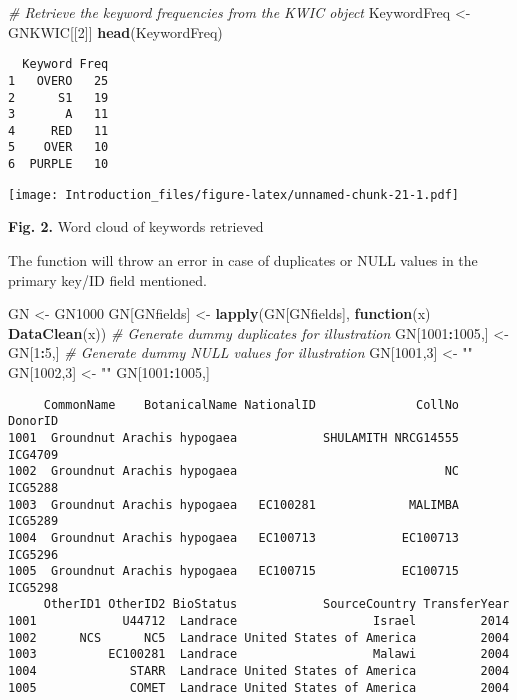 \documentclass[]{article}
\newenvironment{Shaded}{\begin{snugshade}}{\end{snugshade}}
\newcommand{\CommentTok}[1]{\textcolor[rgb]{0.56,0.35,0.01}{\textit{#1}}}
\newcommand{\ControlFlowTok}[1]{\textcolor[rgb]{0.13,0.29,0.53}{\textbf{#1}}}
\newcommand{\DecValTok}[1]{\textcolor[rgb]{0.00,0.00,0.81}{#1}}
\newcommand{\KeywordTok}[1]{\textcolor[rgb]{0.13,0.29,0.53}{\textbf{#1}}}
\newcommand{\NormalTok}[1]{#1}
\newcommand{\OperatorTok}[1]{\textcolor[rgb]{0.81,0.36,0.00}{\textbf{#1}}}
\newcommand{\StringTok}[1]{\textcolor[rgb]{0.31,0.60,0.02}{#1}}
\begin{document}
\begin{Shaded}
\begin{Highlighting}[]
\CommentTok{# Retrieve the keyword frequencies from the KWIC object}
\NormalTok{KeywordFreq <-}\StringTok{ }\NormalTok{GNKWIC[[}\DecValTok{2}\NormalTok{]]}
\KeywordTok{head}\NormalTok{(KeywordFreq)}
\end{Highlighting}
\end{Shaded}

\begin{verbatim}
  Keyword Freq
1   OVERO   25
2      S1   19
3       A   11
4     RED   11
5    OVER   10
6  PURPLE   10
\end{verbatim}

\texttt{[image: Introduction\_files/figure-latex/unnamed-chunk-21-1.pdf]}

\textbf{Fig. 2.} Word cloud of keywords retrieved

The function will throw an error in case of duplicates or NULL values in
the primary key/ID field mentioned.

\begin{Shaded}
\begin{Highlighting}[]
\NormalTok{GN <-}\StringTok{ }\NormalTok{GN1000}
\NormalTok{GN[GNfields] <-}\StringTok{ }\KeywordTok{lapply}\NormalTok{(GN[GNfields], }\ControlFlowTok{function}\NormalTok{(x) }\KeywordTok{DataClean}\NormalTok{(x))}
\CommentTok{# Generate dummy duplicates for illustration}
\NormalTok{GN[}\DecValTok{1001}\OperatorTok{:}\DecValTok{1005}\NormalTok{,] <-}\StringTok{ }\NormalTok{GN[}\DecValTok{1}\OperatorTok{:}\DecValTok{5}\NormalTok{,]}
\CommentTok{# Generate dummy NULL values for illustration}
\NormalTok{GN[}\DecValTok{1001}\NormalTok{,}\DecValTok{3}\NormalTok{] <-}\StringTok{ ""}
\NormalTok{GN[}\DecValTok{1002}\NormalTok{,}\DecValTok{3}\NormalTok{] <-}\StringTok{ ""}
\NormalTok{GN[}\DecValTok{1001}\OperatorTok{:}\DecValTok{1005}\NormalTok{,]}
\end{Highlighting}
\end{Shaded}

\begin{verbatim}
     CommonName    BotanicalName NationalID              CollNo DonorID
1001  Groundnut Arachis hypogaea            SHULAMITH NRCG14555 ICG4709
1002  Groundnut Arachis hypogaea                             NC ICG5288
1003  Groundnut Arachis hypogaea   EC100281             MALIMBA ICG5289
1004  Groundnut Arachis hypogaea   EC100713            EC100713 ICG5296
1005  Groundnut Arachis hypogaea   EC100715            EC100715 ICG5298
     OtherID1 OtherID2 BioStatus            SourceCountry TransferYear
1001            U44712  Landrace                   Israel         2014
1002      NCS      NC5  Landrace United States of America         2004
1003          EC100281  Landrace                   Malawi         2004
1004             STARR  Landrace United States of America         2004
1005             COMET  Landrace United States of America         2004
\end{verbatim}
\end{document}
